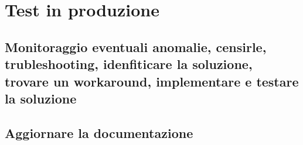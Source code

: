 \documentclass[Realizzazione.tex]{subfiles}
\begin{document}
\section{Test in produzione}
\subsection{Monitoraggio eventuali anomalie, censirle, trubleshooting, idenfiticare la soluzione, trovare un workaround, implementare e testare la soluzione}
\subsection{Aggiornare la documentazione}
	
\end{document}
